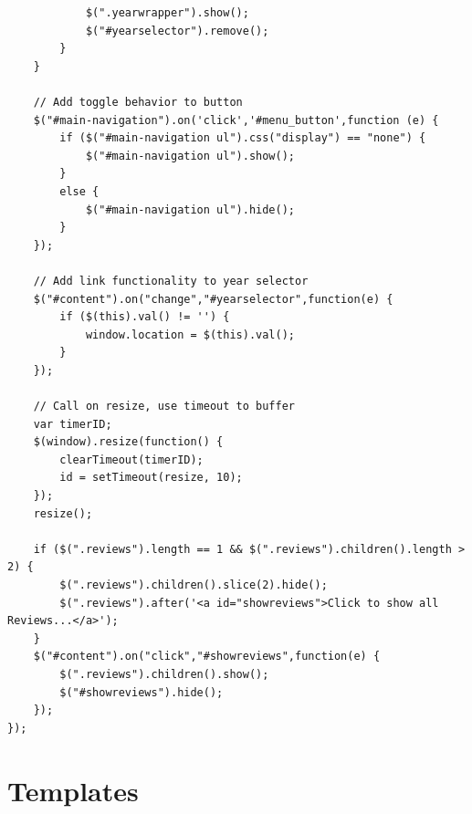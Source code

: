 \documentclass[10pt,a4paper]{scrreprt}
\begin{document}
\begin{appendices}
\begin{verbatim}
            $(".yearwrapper").show();
            $("#yearselector").remove();
        }
    }

    // Add toggle behavior to button
    $("#main-navigation").on('click','#menu_button',function (e) {
        if ($("#main-navigation ul").css("display") == "none") {
            $("#main-navigation ul").show();
        }
        else {
            $("#main-navigation ul").hide();
        }
    });

    // Add link functionality to year selector
    $("#content").on("change","#yearselector",function(e) {
        if ($(this).val() != '') {
            window.location = $(this).val();
        }
    });

    // Call on resize, use timeout to buffer
    var timerID;
    $(window).resize(function() {
        clearTimeout(timerID);
        id = setTimeout(resize, 10);
    });
    resize();

    if ($(".reviews").length == 1 && $(".reviews").children().length > 2) {
        $(".reviews").children().slice(2).hide();
        $(".reviews").after('<a id="showreviews">Click to show all Reviews...</a>');
    }
    $("#content").on("click","#showreviews",function(e) {
        $(".reviews").children().show();
        $("#showreviews").hide();
    });
});
\end{verbatim}

\section{Templates}


\inputminted{html}{templates.html}

\end{appendices}
\end{document}
